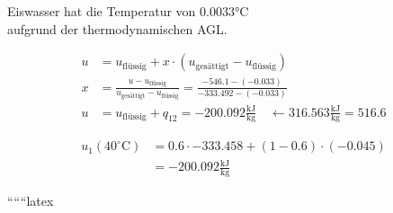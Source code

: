 Eiswasser hat die Temperatur von 0.0033°C \\
aufgrund der thermodynamischen AGL.

\begin{align*}
u &= u_{\text{flüssig}} + x \cdot (u_{\text{gesättigt}} - u_{\text{flüssig}}) \\
x &= \frac{u - u_{\text{flüssig}}}{u_{\text{gesättigt}} - u_{\text{flüssig}}} = \frac{-546.1 - (-0.033)}{-333.492 - (-0.033)} \\
u &= u_{\text{flüssig}} + q_{12} = -200.092 \frac{\text{kJ}}{\text{kg}} \quad \leftarrow 316.563 \frac{\text{kJ}}{\text{kg}} = 516.6
\end{align*}

\begin{align*}
u_1 (40^\circ \text{C}) &= 0.6 \cdot -333.458 + (1 - 0.6) \cdot (-0.045) \\
&= -200.092 \frac{\text{kJ}}{\text{kg}}
\end{align*}

``````latex


